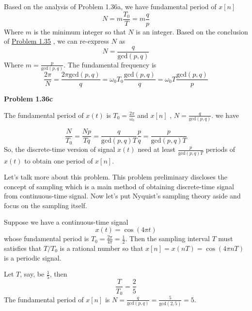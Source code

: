 \documentclass[koma,a4paper,utopia,12pt,listings-color,microtype,paralist,colorlinks,urlcolor=red]{org-article}
\begin{document}
Based on the analysis of Problem 1.36a, we have fundamental period of \(x[n]\)
\begin{equation*}
N = m\frac{T_{0}}{T} = m \frac{q}{p}
\end{equation*}
Where \(m\) is the minimum integer so that \(N\) is an integer. Based on the
conclusion of \hyperref[sec:orgd2ae89c]{Problem 1.35} , we can re-express \(N\) as
\begin{equation*}
N = \frac{q}{\mathrm{gcd}(p,q)}
\end{equation*}
Where \(m = \frac{p}{\mathrm{gcd}(p,q)}\).
The fundamental frequency is
\begin{equation*}
\frac{2\pi}{N} = \frac{2\pi \mathrm{gcd}(p,q)}{q} = \omega_{0}T_{0} \frac{\mathrm{gcd}(p,q)}{q} = \omega_{0}T\frac{\mathrm{gcd}(p,q)}{p}
\end{equation*}

\textbf{Problem 1.36c}

The fundamental period of \(x(t)\) is \(T_{0} = \frac{2\pi}{\omega_{0}}\) and
\(x[n]\) , \(N= \frac{q}{\mathrm{gcd}(p,q)}\). we have

\begin{equation*}
\frac{N}{T_{0}}= \frac{Np}{Tq} = \frac{q}{\mathrm{gcd}(p,q)T} \frac{p}{q} = \frac{p}{\mathrm{gcd}(p,q)T}
\end{equation*}
So, the discrete-time version of signal \(x(t)\) need at least
\(\frac{p}{\mathrm{gcd}(p,q)T}\) periods of \(x(t)\) to obtain one period of \(x[n]\).

Let's talk more about this problem. This problem preliminary discloses the concept
of sampling which is a main method of obtaining discrete-time signal from
continuous-time signal. Now let's put Nyquist's sampling theory aside and focus
on the sampling itself.

Suppose we have a continuous-time signal
\begin{equation*}
x(t) = \cos(4\pi t)
\end{equation*}
whose fundamental period is \(T_{0} = \frac{2\pi }{4\pi} = \frac{1}{2}\). Then
the sampling interval \(T\) must satisfies that \(T/T_{0}\) is a rational
number so that \(x[n]= x(nT)= \cos(4\pi nT )\) is a periodic signal.

Let \(T\), say, be \(\frac{1}{5}\), then
\begin{equation*}
\frac{T}{T_{0}} = \frac{2}{5}
\end{equation*}
The fundamental period of \(x[n]\) is \(N = \frac{q}{\mathrm{gcd}(p,q)} =
\frac{5}{\mathrm{gcd}(2,5)} = 5\).
\end{document}
